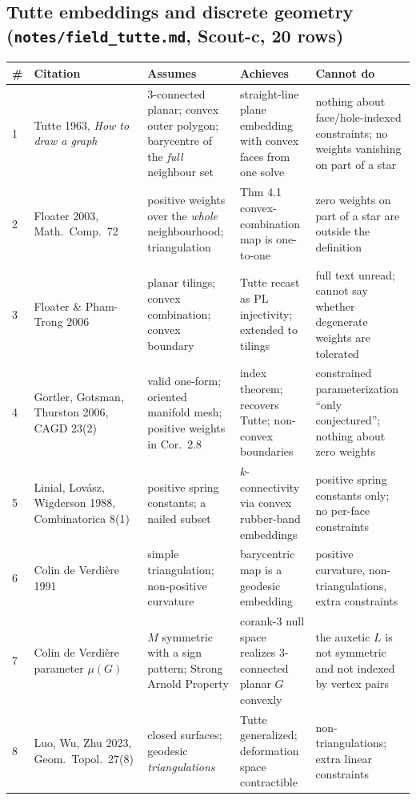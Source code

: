 \documentclass[10pt,a4paper]{article}
\begin{document}
\subsection{Tutte embeddings and discrete geometry (\texttt{notes/field\_tutte.md}, Scout-c, 20 rows)}

\begin{longtable}{@{}p{6mm}p{36mm}p{40mm}p{36mm}p{42mm}@{}}
\toprule
\# & Citation & Assumes & Achieves & Cannot do \\
\midrule
\endhead
1 & Tutte 1963, \emph{How to draw a graph} & 3-connected planar; convex outer polygon; barycentre of the \emph{full} neighbour set & straight-line plane embedding with convex faces from one solve & nothing about face/hole-indexed constraints; no weights vanishing on part of a star \\
2 & Floater 2003, Math.\ Comp.\ 72 & positive weights over the \emph{whole} neighbourhood; triangulation & Thm 4.1 convex-combination map is one-to-one & zero weights on part of a star are outside the definition \\
3 & Floater \& Pham-Trong 2006 & planar tilings; convex combination; convex boundary & Tutte recast as PL injectivity; extended to tilings & full text unread; cannot say whether degenerate weights are tolerated \\
4 & Gortler, Gotsman, Thurston 2006, CAGD 23(2) & valid one-form; oriented manifold mesh; positive weights in Cor.~2.8 & index theorem; recovers Tutte; non-convex boundaries & constrained parameterization ``only conjectured''; nothing about zero weights \\
5 & Linial, Lov\'asz, Wigderson 1988, Combinatorica 8(1) & positive spring constants; a nailed subset & $k$-connectivity via convex rubber-band embeddings & positive spring constants only; no per-face constraints \\
6 & Colin de Verdi\`ere 1991 & simple triangulation; non-positive curvature & barycentric map is a geodesic embedding & positive curvature, non-triangulations, extra constraints \\
7 & Colin de Verdi\`ere parameter $\mu(G)$ & $M$ symmetric with a sign pattern; Strong Arnold Property & corank-3 null space realizes 3-connected planar $G$ convexly & the auxetic $L$ is not symmetric and not indexed by vertex pairs \\
8 & Luo, Wu, Zhu 2023, Geom.\ Topol.\ 27(8) & closed surfaces; geodesic \emph{triangulations} & Tutte generalized; deformation space contractible & non-triangulations; extra linear constraints \\

\end{longtable}
\end{document}

